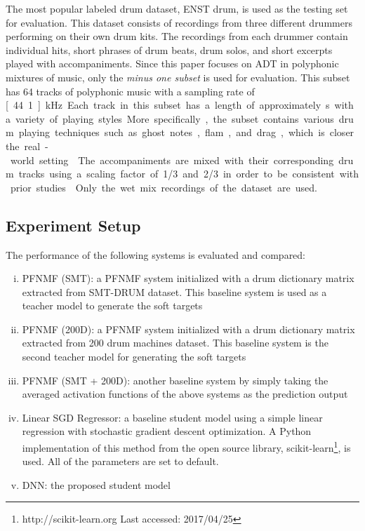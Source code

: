 \documentclass{article}
\begin{document}
The most popular labeled drum dataset, ENST drum\cite{Gillet2006}, is used as the testing set for evaluation. This dataset consists of recordings from three different drummers performing on their own drum kits. The recordings from each drummer contain individual hits, short phrases of drum beats, drum solos, and short excerpts played with accompaniments. Since this paper focuses on ADT in polyphonic mixtures of music, only the \textit{minus one subset} is used for evaluation. This subset has 64 tracks of polyphonic music with a sampling rate of \unit[44.1]{kHz}. Each track in this subset has a length of approximately \unit[70]{s} with a variety of playing styles. More specifically, the subset contains various drum playing techniques such as ghost notes, flam, and drag, which is closer the real-world setting \cite{Wu2016}. The accompaniments are mixed with their corresponding drum tracks using a scaling factor of 1/3 and 2/3 in order to be consistent with prior studies \cite{Paulus2009a, Wu2015a, Southall2016}. Only the wet mix recordings of the dataset are used. 




\subsection{Experiment Setup}
The performance of the following systems is evaluated and compared: 
\begin{enumerate}[(i)]
\item   PFNMF (SMT): a PFNMF system initialized with a drum dictionary matrix extracted from SMT-DRUM dataset. This baseline system is used as a teacher model to generate the soft targets
\item   PFNMF (200D): a PFNMF system initialized with a drum dictionary matrix extracted from 200 drum machines dataset. This baseline system is the second teacher model for generating the soft targets
\item   PFNMF (SMT + 200D): another baseline system by simply taking the averaged activation functions of the above systems as the prediction output
\item   Linear SGD Regressor: a baseline student model using a simple linear regression with stochastic gradient descent optimization. A Python implementation of this method from the open source library, scikit-learn\footnote{http://scikit-learn.org Last accessed: 2017/04/25}, is used. All of the parameters are set to default.
\item   DNN: the proposed student model 
\end{enumerate}
\end{document}

